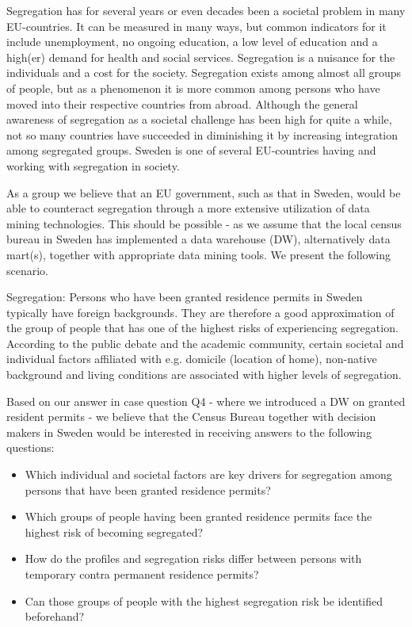 Segregation has for several years or even decades been a societal problem in many EU-countries. 
It can be measured in many ways, but common indicators for it include unemployment, no ongoing education, 
a low level of education and a high(er) demand for health and social services. 
Segregation is a nuisance for the individuals and a cost for the society. 
Segregation exists among almost all groups of people, 
but as a phenomenon it is more common among persons who have moved into their respective countries from abroad. 
Although the general awareness of segregation as a societal challenge has been high for quite a while, 
not so many countries have succeeded in diminishing it by increasing integration among segregated groups. 
Sweden is one of several EU-countries having and working with segregation in society.  

As a group we believe that an EU government, 
such as that in Sweden, would be able to counteract segregation through a more extensive utilization of data mining technologies. 
This should be possible - as we assume that the local census bureau in Sweden has implemented a data warehouse (DW), 
alternatively data mart(s), together with appropriate data mining tools. 
We present the following scenario. 

Segregation: Persons who have been granted residence permits in Sweden typically have foreign backgrounds. 
They are therefore a good approximation of the group of people that has one of the highest risks of experiencing segregation. 
According to the public debate and the academic community, 
certain societal and individual factors affiliated with e.g. domicile (location of home), 
non-native background and living conditions are associated with higher levels of segregation.  

Based on our answer in case question Q4 - where we introduced a DW on granted resident permits - 
we believe that the Census Bureau together with decision makers in Sweden would be interested in 
receiving answers to the following questions: 
\begin{itemize}
  \item Which individual and societal factors are key drivers for segregation among persons that have been granted residence permits? 
  \item Which groups of people having been granted residence permits face the highest risk of becoming segregated? 
  \item How do the profiles and segregation risks differ between persons with temporary contra permanent residence permits? 
  \item Can those groups of people with the highest segregation risk be identified beforehand? 
\end{itemize}

